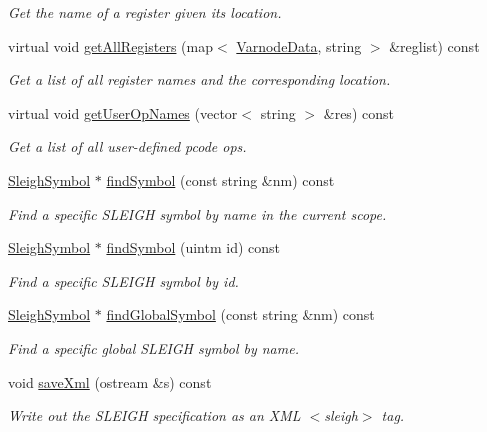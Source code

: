 \begin{DoxyCompactItemize}
\begin{DoxyCompactList}\small\item\em Get the name of a register given its location. \end{DoxyCompactList}\item 
virtual void \mbox{\hyperlink{class_sleigh_base_a4955cd43fdbc36936982f32850bac0ed}{get\+All\+Registers}} (map$<$ \mbox{\hyperlink{struct_varnode_data}{Varnode\+Data}}, string $>$ \&reglist) const
\begin{DoxyCompactList}\small\item\em Get a list of all register names and the corresponding location. \end{DoxyCompactList}\item 
virtual void \mbox{\hyperlink{class_sleigh_base_a5a3a4777d4e63afce414c17bf23617dd}{get\+User\+Op\+Names}} (vector$<$ string $>$ \&res) const
\begin{DoxyCompactList}\small\item\em Get a list of all {\itshape user-\/defined} pcode ops. \end{DoxyCompactList}\item 
\mbox{\hyperlink{class_sleigh_symbol}{Sleigh\+Symbol}} $\ast$ \mbox{\hyperlink{class_sleigh_base_ab20a4e83bfe267c5a524327856e8ee54}{find\+Symbol}} (const string \&nm) const
\begin{DoxyCompactList}\small\item\em Find a specific S\+L\+E\+I\+GH symbol by name in the current scope. \end{DoxyCompactList}\item 
\mbox{\hyperlink{class_sleigh_symbol}{Sleigh\+Symbol}} $\ast$ \mbox{\hyperlink{class_sleigh_base_a972d77c5f1fe151be99689dc6bbbbb24}{find\+Symbol}} (uintm id) const
\begin{DoxyCompactList}\small\item\em Find a specific S\+L\+E\+I\+GH symbol by id. \end{DoxyCompactList}\item 
\mbox{\hyperlink{class_sleigh_symbol}{Sleigh\+Symbol}} $\ast$ \mbox{\hyperlink{class_sleigh_base_aa0df65ed7937d35defce5296a55e5fe5}{find\+Global\+Symbol}} (const string \&nm) const
\begin{DoxyCompactList}\small\item\em Find a specific global S\+L\+E\+I\+GH symbol by name. \end{DoxyCompactList}\item 
void \mbox{\hyperlink{class_sleigh_base_a2231c60a93b577e7bd844b97ac0ef60f}{save\+Xml}} (ostream \&s) const
\begin{DoxyCompactList}\small\item\em Write out the S\+L\+E\+I\+GH specification as an X\+ML $<$sleigh$>$ tag. \end{DoxyCompactList}\end{DoxyCompactItemize}
